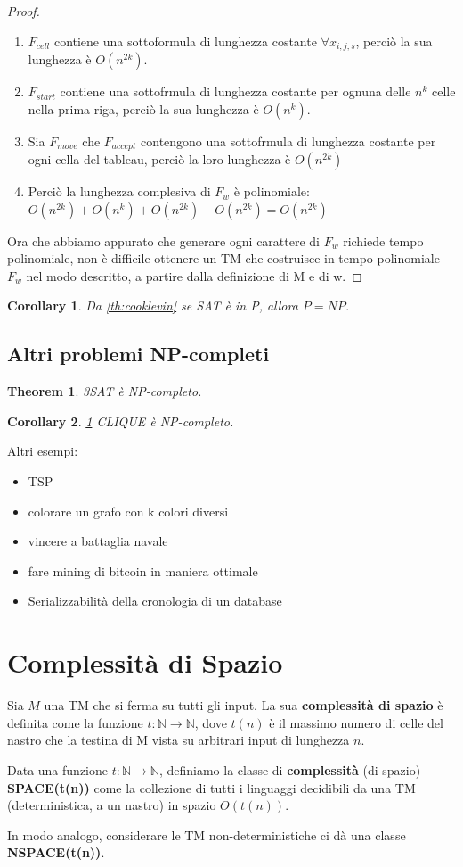\documentclass[a4paper, 12pt]{article}
\newtheorem{theorem}{Theorem}[section]
\newtheorem{corollary}{Corollary}[theorem]
\begin{document}
\begin{proof}
\begin{enumerate}
\item $F_{cell}$ contiene una sottoformula di lunghezza costante $\forall x_{i,j,s}$, perci\`o la sua lunghezza \`e $O(n^{2k})$.
\item $F_{start}$ contiene una sottofrmula di lunghezza costante per ognuna delle $n^{k}$ celle nella prima riga, perci\`o la sua lunghezza \`e $O(n^{k})$.
\item Sia $F_{move}$ che $F_{accept}$ contengono una sottofrmula di lunghezza costante per ogni cella del tableau, perci\`o la loro lunghezza \`e $O(n^{2k})$
\item Perci\`o la lunghezza complesiva di $F_w$ \`e polinomiale: $O(n^{2k}) + O(n^k) + O(n^{2k}) + O(n^{2k}) = O(n^{2k})$
\end{enumerate}
Ora che abbiamo appurato che generare ogni carattere di $F_w$ richiede tempo polinomiale, non \`e difficile ottenere un TM che costruisce in tempo polinomiale $F_w$ nel modo descritto, a partire dalla definizione di M e di w.
\end{proof}

\begin{corollary}
Da \ref{th:cooklevin} se SAT \`e in P, allora $P=NP$.
\end{corollary}

\subsection{Altri problemi NP-completi}
\begin{theorem}
\label{th:3sat_np}
3SAT \`e NP-completo.
\end{theorem}
\begin{corollary}
\ref{th:3sat_np}
CLIQUE \`e NP-completo.
\end{corollary}
Altri esempi:
\begin{itemize}
\item TSP
\item colorare un grafo con k colori diversi
\item vincere a battaglia navale
\item fare mining di bitcoin in maniera ottimale
\item Serializzabilit\`a della cronologia di un database
\end{itemize}
\newpage
\section{Complessit\`a di Spazio}
Sia $M$ una TM che si ferma su tutti gli input. La sua \textbf{complessit\`a di spazio} \`e definita come la funzione $t: \mathbb{N} \rightarrow \mathbb{N}$, dove $t(n)$ \`e il massimo numero di celle del nastro che la testina di M vista su arbitrari input di lunghezza $n$.\\
\begin{center}
Data una funzione $t:\mathbb{N} \rightarrow \mathbb{N}$, definiamo la classe di \textbf{complessit\`a } (di spazio) \textbf{SPACE(t(n))} come la collezione di tutti i linguaggi decidibili da una TM (deterministica, a un nastro) in spazio $O(t(n))$.
\end{center}
In modo analogo, considerare le TM non-deterministiche ci d\`a una classe  \textbf{NSPACE(t(n))}.
\end{document}
